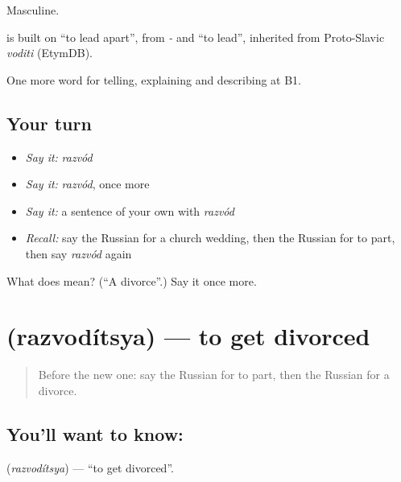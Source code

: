Masculine.

\begin{cousinweb}
\emph{} is built on \emph{} \textquotedblleft{}to lead apart\textquotedblright{}, from \emph{-} and \emph{} \textquotedblleft{}to lead\textquotedblright{}, inherited from Proto-Slavic \emph{voditi} (EtymDB).
\end{cousinweb}

\begin{grammarlens}[title={What you've built}]
One more word for telling, explaining and describing at B1.
\end{grammarlens}

\subsection*{Your turn}
\begin{itemize}
\raggedright
  \item \emph{Say it:} \emph{razvód}
  \item \emph{Say it:} \emph{razvód}, once more
  \item \emph{Say it:} a sentence of your own with \emph{razvód}
  \item \emph{Recall:} say the Russian for a church wedding, then the Russian for to part, then say \emph{razvód} again
\end{itemize}

\begin{tcolorbox}[breakable,colback=teal!4,colframe=teal!35!black,title={Before you move on}]
What does  mean? (\textquotedblleft{}A divorce\textquotedblright{}.) Say it once more.
\end{tcolorbox}
\section[\texorpdfstring{\ru{разводиться} (razvodítsya)}{разводиться (razvodítsya)}]{ (razvodítsya) — to get divorced}

\label{lesson:RU-C307-razvoditsya}



\begin{quote}
Before the new one: say the Russian for to part, then the Russian for a divorce.
\end{quote}

\subsection*{You'll want to know: }
\textbf{} (\emph{razvodítsya}) — \textquotedblleft{}to get divorced\textquotedblright{}.

